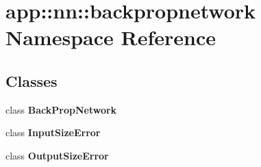 \section{app::nn::backpropnetwork Namespace Reference}
\label{namespaceapp_1_1nn_1_1backpropnetwork}


\subsection*{Classes}
\begin{CompactItemize}
\item 
class {\bf BackPropNetwork}
\item 
class {\bf InputSizeError}
\item 
class {\bf OutputSizeError}
\end{CompactItemize}
